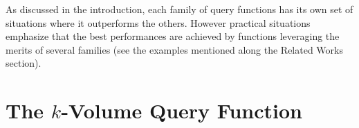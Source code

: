 \documentclass[twoside]{article}
\theoremstyle{definition}
\theoremstyle{remark}
\begin{document}
        
%
%
As discussed in the introduction, each family of query functions has its own set of situations where it outperforms the others. However practical situations emphasize that the best performances are achieved by functions leveraging the merits of several families (see the examples mentioned along the Related Works section). 




\section{The $k$-Volume Query Function}
\label{sec:our_method}
\end{document}
